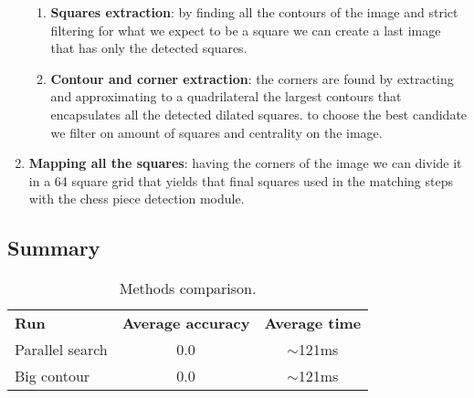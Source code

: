 \begin{enumerate}
{\begin{enumerate}
{                contains the whole projected board.
            }
            \item
            {
                \textbf{Squares extraction}: by finding all the contours of the image and strict filtering for what we expect to be a square 
                we can create a last image that has only the detected squares.
            }
            \item
            {
                \textbf{Contour and corner extraction}: the corners are found by extracting and approximating to a quadrilateral the largest contours that encapsulates all 
                the detected dilated squares. \newline
                to choose the best candidate we filter on amount of squares and centrality on the image.
            }
        \end{enumerate}
    }
    \item 
    {
        \textbf{Mapping all the squares}: having the corners of the image we can divide it in a 64 square grid that yields that final squares used in the matching steps with the
        chess piece detection module.
    }
\end{enumerate}


\subsection{Summary}

\begin{table}[ht]
\centering
\caption{Methods comparison.}
\label{chessboard:table:methods}
\begin{tabular}{lcc}
\textbf{Run} & \textbf{Average accuracy} & \textbf{Average time} \\
Parallel search & 0.0 & $\sim$121ms \\
Big contour & 0.0 & $\sim$121ms
\end{tabular}
\end{table}